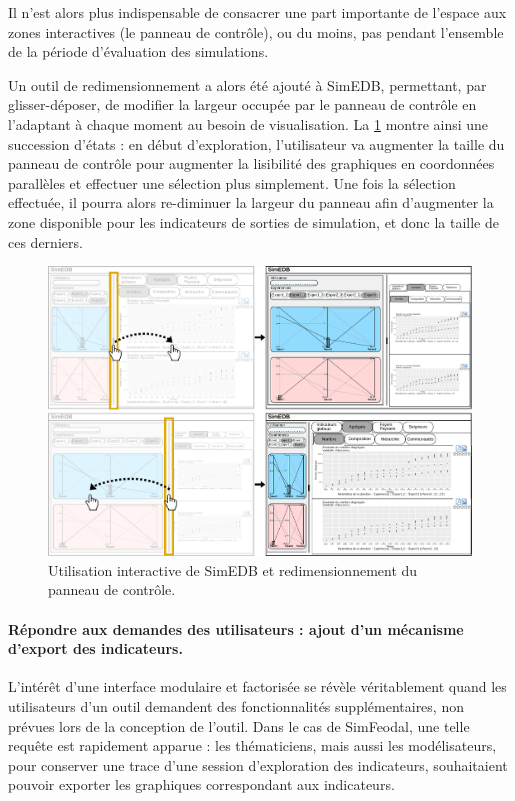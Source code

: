 Il n'est alors plus indispensable de consacrer une part importante de l'espace aux zones interactives (le panneau de contrôle), ou du moins, pas pendant l'ensemble de la période d'évaluation des simulations.

Un outil de redimensionnement a alors été ajouté à SimEDB, permettant, par glisser-déposer, de modifier la largeur occupée par le panneau de contrôle en l'adaptant à chaque moment au besoin de visualisation.
La \cref{fig:resizing} montre ainsi une succession d'états : en début d'exploration, l'utilisateur va augmenter la taille du panneau de contrôle pour augmenter la lisibilité des graphiques en coordonnées parallèles et effectuer une sélection plus simplement.
Une fois la sélection effectuée, il pourra alors re-diminuer la largeur du panneau afin d'augmenter la zone disponible pour les indicateurs de sorties de simulation, et donc la taille de ces derniers. 

\begin{figure}[H]
	\centering
	\includegraphics[width=\linewidth]{img/mockup_SimEDB_resize.pdf}
	\caption{Utilisation interactive de SimEDB et redimensionnement du panneau de contrôle.}
	\label{fig:resizing}
\end{figure}

\paragraph{Répondre aux demandes des utilisateurs : ajout d'un mécanisme d'export des indicateurs.}

L'intérêt d'une interface modulaire et factorisée se révèle véritablement quand les utilisateurs d'un outil demandent des fonctionnalités supplémentaires, non prévues lors de la conception de l'outil.
Dans le cas de SimFeodal, une telle requête est rapidement apparue : les thématiciens, mais aussi les modélisateurs, pour conserver une trace d'une session d'exploration des indicateurs, souhaitaient pouvoir exporter les graphiques correspondant aux indicateurs.

